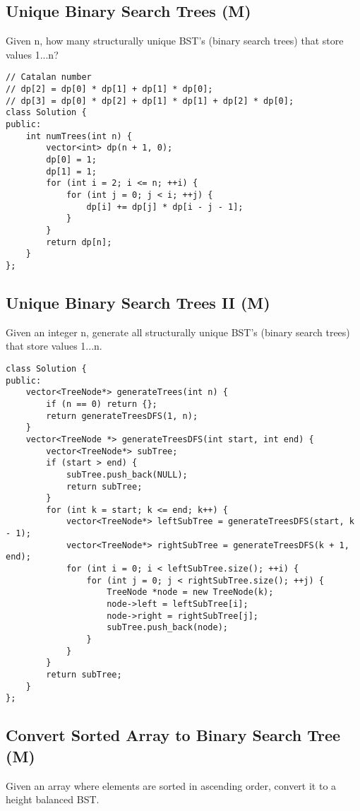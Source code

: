 \subsection{Unique Binary Search Trees (M)}
Given n, how many structurally unique BST's (binary search trees) that store values 1...n?

\begin{lstlisting}
// Catalan number
// dp[2] = dp[0] * dp[1] + dp[1] * dp[0];
// dp[3] = dp[0] * dp[2] + dp[1] * dp[1] + dp[2] * dp[0];
class Solution {
public:
    int numTrees(int n) {
        vector<int> dp(n + 1, 0);
        dp[0] = 1;
        dp[1] = 1;
        for (int i = 2; i <= n; ++i) {          
            for (int j = 0; j < i; ++j) {
                dp[i] += dp[j] * dp[i - j - 1];
            }
        }
        return dp[n];
    }
};
\end{lstlisting}


\subsection{Unique Binary Search Trees II (M)}
Given an integer n, generate all structurally unique BST's (binary search trees) that store values 1...n.

\begin{lstlisting}
class Solution {
public:
    vector<TreeNode*> generateTrees(int n) {
        if (n == 0) return {};
        return generateTreesDFS(1, n);
    }
    vector<TreeNode *> generateTreesDFS(int start, int end) {
        vector<TreeNode*> subTree;
        if (start > end) {
            subTree.push_back(NULL);
            return subTree;
        }
        for (int k = start; k <= end; k++) {
            vector<TreeNode*> leftSubTree = generateTreesDFS(start, k - 1);
            vector<TreeNode*> rightSubTree = generateTreesDFS(k + 1, end);
            for (int i = 0; i < leftSubTree.size(); ++i) {
                for (int j = 0; j < rightSubTree.size(); ++j) {
                    TreeNode *node = new TreeNode(k);
                    node->left = leftSubTree[i];
                    node->right = rightSubTree[j];
                    subTree.push_back(node);
                }
            }
        }
        return subTree;
    }
};
\end{lstlisting}


\subsection{Convert Sorted Array to Binary Search Tree (M)}
Given an array where elements are sorted in ascending order, convert it to a height balanced BST.\\

